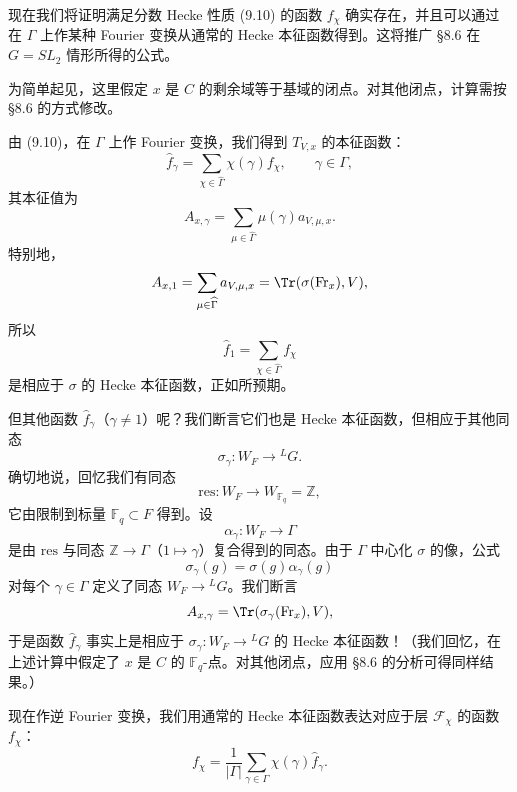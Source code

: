 现在我们将证明满足分数 Hecke 性质 (9.10) 的函数 $f_\chi$ 确实存在，并且可以通过在 $\Gamma$ 上作某种 Fourier 变换从通常的 Hecke 本征函数得到。这将推广 §8.6 在 $G=SL_2$ 情形所得的公式。


为简单起见，这里假定 $x$ 是 $C$ 的剩余域等于基域的闭点。对其他闭点，计算需按 §8.6 的方式修改。

由 (9.10)，在 $\Gamma$ 上作 Fourier 变换，我们得到 $T_{V,x}$ 的本征函数：
\begin{equation}\tag{9.13}
\widehat{f}_\gamma = \sum_{\chi\in\widehat{\Gamma}}\chi(\gamma)f_\chi,
\qquad \gamma\in\Gamma,
\end{equation}
其本征值为
\begin{equation}\tag{9.14}
A_{x,\gamma} = \sum_{\mu\in\widehat{\Gamma}}\mu(\gamma)a_{V,\mu,x}.
\end{equation}
特别地，
\[
A_{x,1} = \sum_{\mu\in\widehat{\Gamma}}a_{V,\mu,x} = \Tr(\sigma(\mathrm{Fr}_x),V),
\]
所以
\[
\widehat{f}_1 = \sum_{\chi\in\widehat{\Gamma}}f_\chi
\]
是相应于 $\sigma$ 的 Hecke 本征函数，正如所预期。

但其他函数 $\widehat{f}_\gamma$（$\gamma\neq 1$）呢？我们断言它们也是 Hecke 本征函数，但相应于其他同态
\[
\sigma_\gamma: W_F\to{}^{L}G.
\]
确切地说，回忆我们有同态
\[
\mathrm{res}: W_F\to W_{\mathbb{F}_q}=\mathbb{Z},
\]
它由限制到标量 $\mathbb{F}_q\subset F$ 得到。设
\[
\alpha_\gamma: W_F\to\Gamma
\]
是由 $\mathrm{res}$ 与同态 $\mathbb{Z}\to\Gamma$（$1\mapsto\gamma$）复合得到的同态。由于 $\Gamma$ 中心化 $\sigma$ 的像，公式
\[
\sigma_\gamma(g) = \sigma(g)\alpha_\gamma(g)
\]
对每个 $\gamma\in\Gamma$ 定义了同态 $W_F\to{}^{L}G$。我们断言
\[
A_{x,\gamma} = \Tr(\sigma_\gamma(\mathrm{Fr}_x),V),
\]
于是函数 $\widehat{f}_\gamma$ 事实上是相应于 $\sigma_\gamma: W_F\to{}^{L}G$ 的 Hecke 本征函数！（我们回忆，在上述计算中假定了 $x$ 是 $C$ 的 $\mathbb{F}_q$-点。对其他闭点，应用 §8.6 的分析可得同样结果。）

现在作逆 Fourier 变换，我们用通常的 Hecke 本征函数表达对应于层 $\mathcal{F}_\chi$ 的函数 $f_\chi$：
\begin{equation}\tag{9.15}
f_\chi = \frac{1}{|\Gamma|}\sum_{\gamma\in\Gamma}\chi(\gamma)\widehat{f}_\gamma.
\end{equation}

